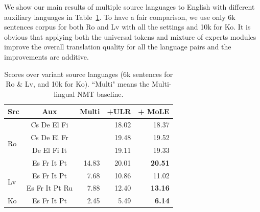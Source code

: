 We show our main results of multiple source languages to English with different auxiliary languages in Table~\ref{cp5.table.bleu}. To have a fair comparison, we use only 6k sentences corpus for both Ro and Lv with all the settings and 10k for Ko. It is obvious that applying both the universal tokens and mixture of experts modules  improve the overall translation quality for all the language pairs and the improvements are additive. 
\begin{table}[hptb]
\centering
\begin{tabular}{l|c|rrr}
Src & Aux   & Multi & +ULR & + MoLE \\ \hline
\multirow{ 4}{*}{Ro}     
& Cs De El Fi & & 18.02 & 18.37   \\
& Cs De El Fr & & 19.48 &  19.52  \\
& De El Fi It & & 19.11 & 19.33   \\
& Es Fr It Pt & 14.83   & 20.01   &  \textbf{20.51} \\ \hline
\multirow{ 2}{*}{Lv}      
& Es Fr It Pt & 7.68     & 10.86     &  11.02 \\ 
& Es Fr It Pt Ru & 7.88     & 12.40     &  \textbf{13.16} \\  \hline
Ko    & Es Fr It Pt  & 2.45    & 5.49    & \textbf{6.14}  \\     
\end{tabular}
\caption{\label{cp5.table.bleu} Scores over variant source languages (6k sentences for Ro \& Lv, and 10k for Ko). ``Multi" means the Multi-lingual NMT baseline.}
\end{table}


